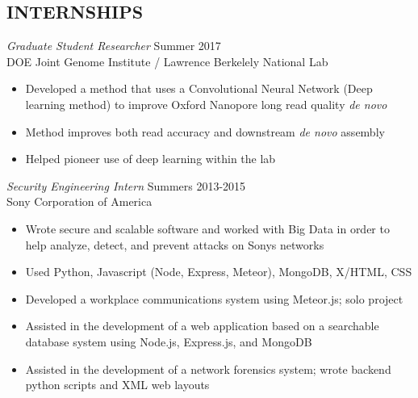 \documentclass[margin, 10pt]{res} %
\begin{document}
\begin{resume}
 
\section{INTERNSHIPS}

{\sl Graduate Student Researcher} \hfill Summer 2017 \\ DOE Joint Genome Institute / Lawrence Berkelely National Lab

\begin{itemize} \itemsep -2pt %
\item Developed a method that uses a Convolutional Neural Network (Deep learning method) to improve Oxford Nanopore long read quality \emph{de novo}
\item Method improves both read accuracy and downstream \emph{de novo} assembly
\item Helped pioneer use of deep learning within the lab
\end{itemize}


{\sl Security Engineering Intern} \hfill Summers 2013-2015 \\
Sony Corporation of America 

\begin{itemize} \itemsep -2pt %
\item Wrote secure and scalable software and worked with Big Data in order to help analyze, detect, and prevent attacks on Sony\textsc{}s networks
\item Used Python, Javascript (Node, Express, Meteor), MongoDB, X/HTML, CSS 
\item Developed a workplace communications system using Meteor.js; solo project
\item Assisted in the development of a web application based on a searchable database system using Node.js, Express.js, and MongoDB
\item Assisted in the development of a network forensics system; wrote backend python scripts and XML web layouts
\end{itemize} 




\end{resume}
\end{document}
